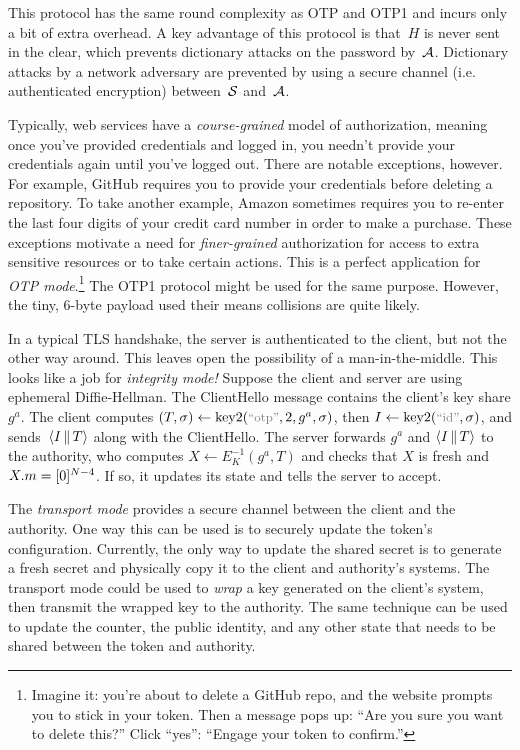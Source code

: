This protocol has the same round complexity as OTP and OTP1 and incurs only a
bit of extra overhead.
%
A key advantage of this protocol is that~$H$ is never sent in the clear, which
prevents dictionary attacks on the password by~$\mathcal{A}$.  Dictionary attacks by a
network adversary are prevented by using a secure channel (i.e. authenticated
encryption) between~$\mathcal{S}$ and~$\mathcal{A}$.

%
Typically, web services have a \emph{course-grained} model of authorization,
meaning once you've provided credentials and logged in, you needn't provide your
credentials again until you've logged out.
%
There are notable exceptions, however. For example, GitHub requires you to
provide your credentials before deleting a repository. To take another example,
Amazon sometimes requires you to re-enter the last four digits of your credit
card number in order to make a purchase. These exceptions motivate a need for
\emph{finer-grained} authorization for access to extra sensitive resources or
to take certain actions.
%
This is a perfect application for \emph{OTP mode}.\footnote{Imagine it: you're
about to delete a GitHub repo, and the website prompts you to stick in your
token. Then a message pops up: ``Are you sure you want to delete this?'' Click
``yes'': ``Engage your token to confirm.''} The OTP1 protocol might be used for
the same purpose. However, the tiny, 6-byte payload used their means collisions
are quite likely.

%
In a typical TLS handshake, the server is authenticated to the client, but not
the other way around. This leaves open the possibility of a man-in-the-middle.
This looks like a job for \emph{integrity mode!}
%
Suppose the client and server are using ephemeral Diffie-Hellman. The
ClientHello message contains the client's key share $g^a$. The client computes
$(T, \sigma) \gets \fancykey(\stringer{otp}, 2, g^a, \sigma)$, then $I \gets
\fancykey(\stringer{id}, \sigma)$, and sends~$\str(I \cat T)$ along with the
ClientHello.
%
The server forwards $g^a$ and $\str(I \cat T)$ to the authority, who computes $X \gets
E^{-1}_K(g^a, T)$ and checks that $X$ is fresh and $X.m = \byte(0)^{N-4}$. If
so, it updates its state and tells the server to accept.

%
The \emph{transport mode} provides a secure channel between the client and the
authority. One way this can be used is to securely update the token's
configuration. Currently, the only way to update the shared secret is to
generate a fresh secret and physically copy it to the client and authority's
systems. The transport mode could be used to \emph{wrap} a key generated on the
client's system, then transmit the wrapped key to the authority. The same
technique can be used to update the counter, the public identity, and any other
state that needs to be shared between the token and authority.

